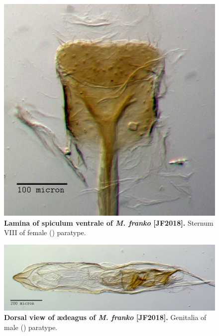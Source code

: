 \documentclass[fleqn,10pt,lineno]{wlpeerj} %
\begin{document}
\begin{figure}[h]
	\centering
	\includegraphics[width=\textwidth]{franko_lamina.jpg}
	\caption{\textbf{Lamina of spiculum ventrale of \textit{M. franko} [JF2018].} Sternum VIII of female (\female) paratype.}
	\label{fig:franko_lamina}
\end{figure}

\begin{figure}[h]
	\centering
	\begin{sideways}
		\includegraphics[width=0.95\textheight]{franko_aedeagus_dorsal.jpg}
	\end{sideways}
	\caption{\textbf{Dorsal view of {\ae}deagus of \textit{M. franko} [JF2018].} Genitalia of male (\male) paratype.}
	\label{fig:franko_aedeagus_dorsal}
\end{figure}
\end{document}
